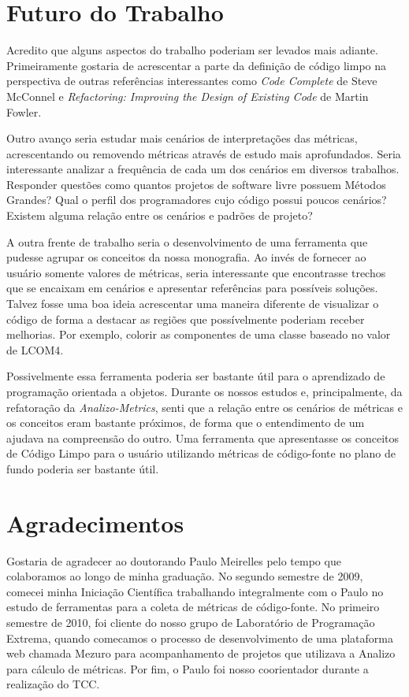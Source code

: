 \documentclass[a4paper, 11pt]{article}
\begin{document}
\section{Futuro do Trabalho}
Acredito que alguns aspectos do trabalho poderiam ser levados mais adiante. Primeiramente gostaria de
acrescentar a parte da definição de código limpo na perspectiva de outras referências interessantes como
\textit{Code Complete} de Steve McConnel e \textit{Refactoring: Improving the Design of Existing Code} de
Martin Fowler.

Outro avanço seria estudar mais cenários de interpretações das métricas, acrescentando ou removendo
métricas através de estudo mais aprofundados. Seria interessante analizar a frequência de cada um
dos cenários em diversos trabalhos. Responder questões como quantos projetos de software livre possuem Métodos Grandes?
Qual o perfil dos programadores cujo código possui poucos cenários? Existem alguma relação entre os cenários e
padrões de projeto?

A outra frente de trabalho seria o desenvolvimento de uma ferramenta que pudesse
agrupar os conceitos da nossa monografia. Ao invés de fornecer ao usuário somente valores de métricas,
seria interessante que encontrasse trechos que se encaixam em cenários e apresentar referências para possíveis 
soluções. Talvez fosse uma boa ideia acrescentar uma maneira diferente de visualizar o código de forma a
destacar as regiões que possívelmente poderiam receber melhorias. Por exemplo, colorir as componentes de uma 
classe baseado no valor de LCOM4.

Possivelmente essa ferramenta poderia ser bastante útil para o aprendizado de programação orientada a objetos.
Durante os nossos estudos e, principalmente, da refatoração da \textit{Analizo-Metrics}, senti que a relação entre
os cenários de métricas e os conceitos eram bastante próximos, de forma que o entendimento de um ajudava na compreensão
do outro. Uma ferramenta que apresentasse os conceitos de Código Limpo para o usuário utilizando métricas de código-fonte
no plano de fundo poderia ser bastante útil.


\section{Agradecimentos}
Gostaria de agradecer ao doutorando Paulo Meirelles pelo tempo que colaboramos ao longo de minha graduação.
No segundo semestre de 2009, comecei minha Iniciação Científica trabalhando integralmente com o Paulo no
estudo de ferramentas para a coleta de métricas de código-fonte. No primeiro semestre de 2010, foi cliente
do nosso grupo de Laboratório de Programação Extrema, quando comecamos o processo de desenvolvimento de uma plataforma web 
chamada Mezuro para acompanhamento de projetos que utilizava a Analizo para cálculo de métricas. Por fim,
o Paulo foi nosso coorientador durante a realização do TCC.
\end{document}
